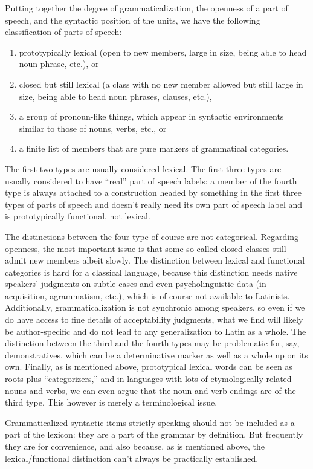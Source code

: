 \documentclass[a4paper, oneside, 12pt]{report}
\begin{document}
Putting together the degree of grammaticalization,
the openness of a part of speech,
and the syntactic position of the units,
we have the following classification of parts of speech:
\begin{enumerate}
    \item prototypically lexical 
    (open to new members, large in size, being able to head noun phrase, etc.), or
    \item closed but still lexical 
    (a class with no new member allowed but still large in size, being able to head noun phrases, clauses, etc.),
    \item a group of pronoun-like things, which appear in syntactic environments similar to those of nouns, verbs, etc., or
    \item a finite list of members that are pure markers of grammatical categories.
\end{enumerate}
The first two types are usually considered lexical.
The first three types are usually considered to have 
``real'' part of speech labels: 
a member of the fourth type is always attached to a construction headed by 
something in the first three types of parts of speech
and doesn't really need its own part of speech label and is prototypically functional, not lexical.

The distinctions between the four type of course are not categorical.
Regarding openness, 
the most important issue is that some so-called closed classes still admit new members albeit slowly.
The distinction between lexical and functional categories is hard for a classical language,
because this distinction needs native speakers' judgments on subtle cases 
and even psycholinguistic data (in acquisition, agrammatism, etc.),
which is of course not available to Latinists.
Additionally, grammaticalization is not synchronic among speakers,
so even if we do have access to fine details of acceptability judgments, 
what we find will likely be author-specific and do not lead to any generalization to Latin as a whole.
The distinction between the third and the fourth types 
may be problematic for, say, demonstratives, 
which can be a determinative marker as well as a whole \acs{np} on its own.
Finally, as is mentioned above, prototypical lexical words
can be seen as roots plus ``categorizers,''
and in languages with lots of etymologically related nouns and verbs,
we can even argue that the noun and verb endings are of the third type.
This however is merely a terminological issue.

Grammaticalized syntactic items strictly speaking should not be included as a part of the lexicon:
they are a part of the grammar by definition.
But frequently they are for convenience,
and also because, as is mentioned above,
the lexical/functional distinction can't always be practically established.
\end{document}
